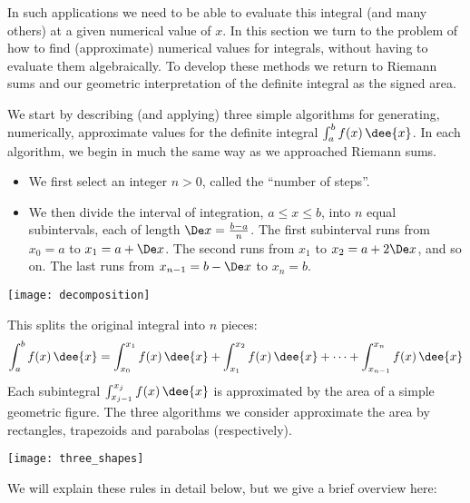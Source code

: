 In such applications we need to be able to evaluate this integral (and many others) at a
given numerical value of $x$. In this section we turn to the problem of how to find
(approximate) numerical values for integrals, without having to evaluate them
algebraically. To develop these methods we return to Riemann sums and our
geometric interpretation of the definite integral as the signed area.

We start by describing (and applying) three simple algorithms for generating,
numerically, approximate values for the definite integral $\int_a^b f(x)\,\dee{x}$. In
each algorithm, we begin in much the same way as we approached Riemann sums.
\begin{itemize}
\item We first select an integer $n>0$, called the ``number
of steps''.
\item We then divide the interval of integration, $a\le x\le b$, into
$n$ equal subintervals, each of length $\De x=\frac{b-a}{n}$. The first subinterval runs
from $x_0=a$ to $x_1=a+\De x$. The second runs from $x_1$ to $x_2=a+2\De x$, and so on.
The last runs from $x_{n-1}=b-\De x$ to $x_n=b$.
\end{itemize}
\begin{efig}
\begin{center}
   \texttt{[image: decomposition]}
\end{center}
\end{efig}
This splits the original integral into $n$ pieces:
\begin{equation*}
\int_a^b f(x)\,\dee{x}
=\int_{x_0}^{x_1} f(x)\,\dee{x}
+\int_{x_1}^{x_2} f(x)\,\dee{x}
+\cdots
+\int_{x_{n-1}}^{x_n} f(x)\,\dee{x}
\end{equation*}
Each subintegral $\int_{x_{j-1}}^{x_j} f(x)\,\dee{x}$ is approximated by the
area of a simple geometric figure. The three algorithms we consider approximate the area
by rectangles, trapezoids and parabolas (respectively).
\begin{wfig}
 \begin{center}
  \texttt{[image: three\_shapes]}
 \end{center}
\end{wfig}
We will explain these rules in detail below, but we give a brief overview here:
